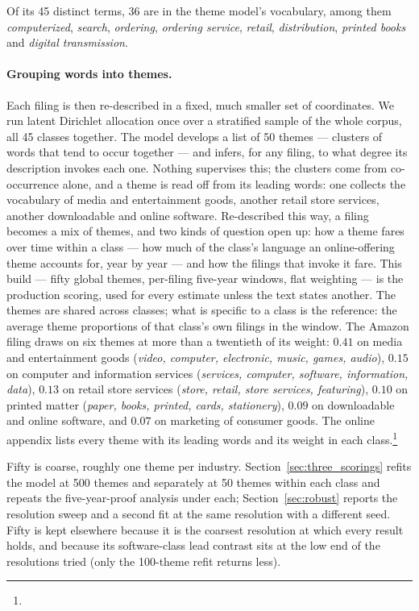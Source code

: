 \noindent Of its 45 distinct terms, 36 are in the theme model's vocabulary,
among them \emph{computerized}, \emph{search}, \emph{ordering},
\emph{ordering service}, \emph{retail}, \emph{distribution}, \emph{printed
books} and \emph{digital transmission}.

\paragraph{Grouping words into themes.} Each filing is then re-described
in a fixed, much smaller set of coordinates. We run latent Dirichlet
allocation once over a stratified sample of the whole corpus, all 45
classes together. The model develops a list of 50 themes --- clusters of
words that tend to occur together --- and infers, for any filing, to what
degree its description invokes each one. Nothing supervises this; the
clusters come from co-occurrence alone, and a theme is read off from its
leading words: one collects the vocabulary of media and entertainment
goods, another retail store services, another downloadable and online
software. Re-described this way, a filing becomes a mix of themes, and
two kinds of question open up: how a theme fares over time within a class
--- how much of the class's language an online-offering theme accounts
for, year by year --- and how the filings that invoke it fare. This
build --- fifty global themes, per-filing five-year windows, flat
weighting --- is the production scoring, used for every estimate unless
the text states another. The themes are shared across classes; what is
specific to a class is the reference: the average theme proportions of
that class's own filings in the window. The Amazon filing draws on six
themes at more than a twentieth of its weight: $0.41$ on media and
entertainment goods (\emph{video, computer, electronic, music, games,
audio}), $0.15$ on computer and information services (\emph{services,
computer, software, information, data}), $0.13$ on retail store services
(\emph{store, retail, store services, featuring}), $0.10$ on printed matter
(\emph{paper, books, printed, cards, stationery}), $0.09$ on downloadable and
online software, and $0.07$ on marketing of consumer goods. The online
appendix lists every theme with its leading words and its weight in each
class.\footnote{\onlineappendixnote}

Fifty is coarse, roughly one theme per industry.
Section~\ref{sec:three_scorings} refits the model at 500 themes and
separately at 50 themes within each class and repeats the five-year-proof
analysis under each; Section~\ref{sec:robust} reports the resolution sweep
and a second fit at the same resolution with a different seed. Fifty is
kept elsewhere because it is the coarsest resolution at which every result
holds, and because its software-class lead contrast sits at the low end of
the resolutions tried (only the 100-theme refit returns less).

